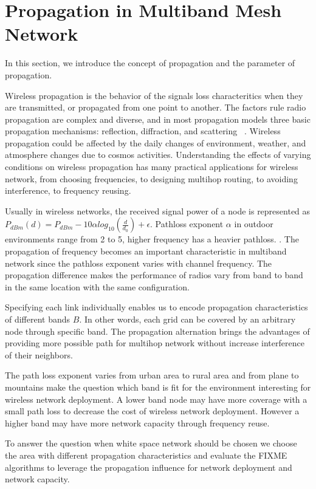 \section{Propagation in Multiband Mesh Network}
\label{sec:propagation}

In this section, we introduce the concept of propagation and the parameter of propagation.

Wireless propagation is the behavior of the signals loss characteritics when they are transmitted, or propagated from one point to another.
The factors rule radio propagation are complex and diverse, and in most propagation models three basic propagation mechanisms: reflection, diffraction, and scattering ~\cite{andersen1995propagation}.
Wireless propagation could be affected by the daily changes of environment, weather, and atmosphere changes due to cosmos activities. 
Understanding the effects of varying conditions on wireless propagation has many practical applications for wireless network, from choosing frequencies, to designing multihop routing, to avoiding interference, to frequency reusing.

Usually in wireless networks, the received signal power of a node is represented as $P_{dBm}(d)=P_{dBm}-10\alpha log_{10}(\frac{d}{d_0})+\epsilon$. Pathloss exponent $\alpha$ in outdoor environments range from 2 to 5, higher frequency has a heavier pathloss. \cite{camp2006measurement}. 
The propagation of frequency becomes an important characteristic in multiband network since the pathloss exponent varies with channel frequency. 
The propagation difference makes the performance of radios vary from band to band in the same location with the same configuration.

Specifying each link individually enables us to encode propagation characteristics of different bands $B$. In other words, each grid can be covered by an arbitrary node through specific band.  
The propagation alternation brings the advantages of providing more possible path for multihop network without increase interference of their neighbors. 

The path loss exponent varies from urban area to rural area and from plane to mountains make the question which band is fit for the environment interesting for wireless network deployment.
A lower band node may have more coverage with a small path loss to decrease the cost of wireless network deployment. However a higher band may have more network capacity through frequency reuse.

To answer the question when white space network should be chosen we choose the area with different propagation characteristics and evaluate the FIXME algorithms to leverage the propagation influence for network deployment and network capacity.
